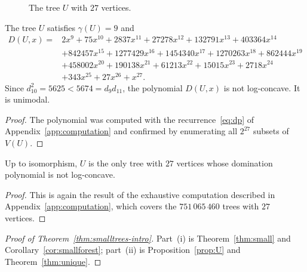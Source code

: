 \begin{figure}[ht]
\centering
{}
\caption{The tree $U$ with $27$ vertices.}\label{fig:U}
\end{figure}

\begin{proposition}\label{prop:U}
The tree $U$ satisfies $\gamma(U)=9$ and
\begin{align*}
 D(U,x)={}& 2x^{9}+75x^{10}+2837x^{11}+27278x^{12}+132791x^{13}+403364x^{14}\\
 &+842457x^{15}+1277429x^{16}+1454340x^{17}+1270263x^{18}+862444x^{19}\\
 &+458002x^{20}+190138x^{21}+61213x^{22}+15015x^{23}+2718x^{24}\\
 &+343x^{25}+27x^{26}+x^{27}.
\end{align*}
Since $d_{10}^2=5625<5674=d_{9}d_{11}$, the polynomial $D(U,x)$ is not
log-concave. It is unimodal.
\end{proposition}

\begin{proof}
The polynomial was computed with the recurrence~\eqref{eq:dp} of
Appendix~\ref{app:computation} and confirmed by enumerating all $2^{27}$
subsets of $V(U)$.
\end{proof}

\begin{theorem}\label{thm:unique}
Up to isomorphism, $U$ is the only tree with $27$ vertices whose domination
polynomial is not log-concave.
\end{theorem}

\begin{proof}
This is again the result of the exhaustive computation described in
Appendix~\ref{app:computation}, which covers the $751\,065\,460$ trees with
$27$ vertices.
\end{proof}

\begin{proof}[Proof of Theorem~\ref{thm:smalltrees-intro}]
Part~(i) is Theorem~\ref{thm:small} and Corollary~\ref{cor:smallforest};
part~(ii) is Proposition~\ref{prop:U} and Theorem~\ref{thm:unique}.
\end{proof}

